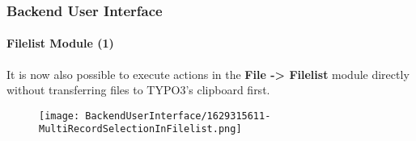 %

\begin{frame}[fragile]
	\frametitle{Backend User Interface}
	\framesubtitle{Filelist Module (1)}

	It is now also possible to execute actions in the \textbf{File -> Filelist}
	module directly without transferring files to TYPO3's clipboard first.

	\begin{figure}
		\texttt{[image: BackendUserInterface/1629315611-MultiRecordSelectionInFilelist.png]}
	\end{figure}

\end{frame}

